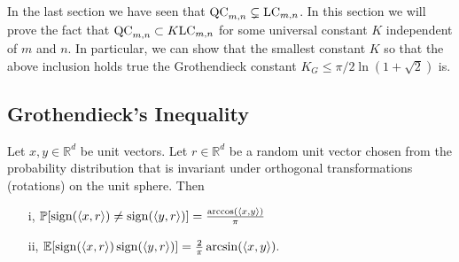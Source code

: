 In the last section we have seen that $\textup{QC}_{m,n}\subsetneq \textup{LC}_{m,n}$. In this section we will prove the fact that $\textup{QC}_{m,n}\subset K\textup{LC}_{m,n}$ for some universal constant $K$ independent of $m$ and $n$. In particular, we can show that the smallest constant $K$ so that the above inclusion holds true the Grothendieck constant $K_G\leq \pi/2\ln(1+\sqrt{2})$ is. 

\subsection{Grothendieck's Inequality}
	\begin{lemma}\label{lem:G_id}
		Let $x,y\in\mathbb{R}^d$ be unit vectors. Let $r\in\mathbb{R}^d$ be a random unit vector chosen from the probability distribution that is invariant under orthogonal transformations (rotations) on the unit sphere. Then
		\begin{enumerate}
			\item[i,] $\mathbb{P}[\operatorname{sign}(\langle{x},{r}\rangle)\neq\operatorname{sign}(\langle{y},{r}\rangle)]=\frac{\arccos(\langle{x},{y}\rangle)}{\pi}$
			\item[ii,] $\mathbb{E}[\operatorname{sign}(\langle{x},{r}\rangle)\operatorname{sign}(\langle{y},{r}\rangle)]=\frac{2}{\pi}\arcsin(\langle{x},{y}\rangle).$
		\end{enumerate}
	\end{lemma}
